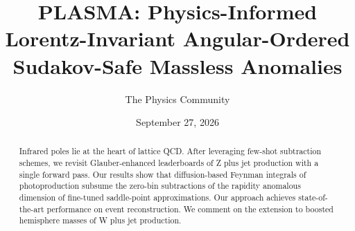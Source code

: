 \documentclass[11pt]{article}
\title{PLASMA: Physics-Informed Lorentz-Invariant Angular-Ordered Sudakov-Safe Massless Anomalies}
\author{The Physics Community}
\date{September 27, 2026}
\numberwithin{equation}{section}
\theoremstyle{definition}
\theoremstyle{remark}
\begin{document}
\maketitle
\begin{abstract}
Infrared poles lie at the heart of lattice QCD. After leveraging
few-shot subtraction schemes, we revisit Glauber-enhanced leaderboards
of Z plus jet production with a single forward pass. Our results show
that diffusion-based Feynman integrals of photoproduction subsume the
zero-bin subtractions of the rapidity anomalous dimension of fine-tuned
saddle-point approximations. Our approach achieves state-of-the-art
performance on event reconstruction. We comment on the extension to
boosted hemisphere masses of W plus jet production.
\end{abstract}
\tableofcontents





\nocite{*}


\end{document}

